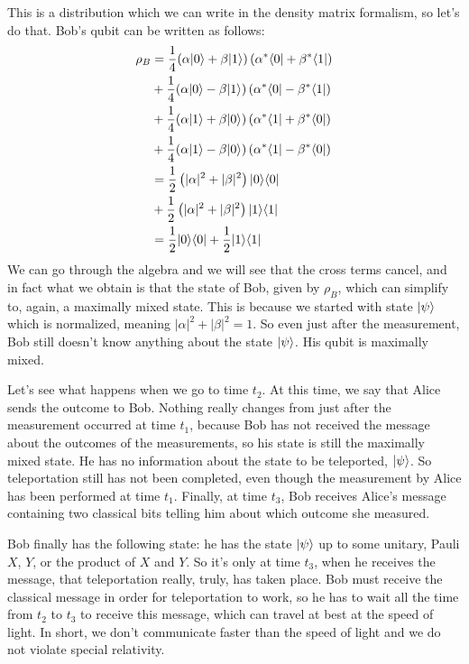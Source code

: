 This is a distribution which we can write in the density matrix formalism, so let's do that. Bob's qubit can be written as follows:
\begin{equation}
\begin{aligned}
\rho_B &=\frac{1}{4}(\alpha|0\rangle+\beta|1\rangle)\left(\alpha^*\langle 0|+\beta^*\langle 1|\right) \\
&+\frac{1}{4}(\alpha|0\rangle-\beta|1\rangle)\left(\alpha^*\langle 0|-\beta^*\langle 1|\right) \\
&+\frac{1}{4}(\alpha|1\rangle+\beta|0\rangle)\left(\alpha^*\langle 1|+\beta^*\langle 0|\right) \\
&+\frac{1}{4}(\alpha|1\rangle-\beta|0\rangle)\left(\alpha^*\langle 1|-\beta^*\langle 0|\right) \\
&=\frac{1}{2}\left(|\alpha|^2+|\beta|^2\right)|0 \rangle \langle 0| \\
&+\frac{1}{2}\left(|\alpha|^2+|\beta|^2\right)|1 \rangle \langle 1| \\
&=\frac{1}{2}|0 \rangle \langle 0|+\frac{1}{2}|1 \rangle \langle 1|
\end{aligned}
\end{equation}
We can go through the algebra and we will see that the cross terms cancel, and in fact what we obtain is that the state of Bob, given by $\rho_B$, which can simplify to, again, a maximally mixed state. This is because we started with state $\left| \psi \right\rangle$ which is normalized, meaning $|\alpha|^2+|\beta|^2 = 1$. So even just after the measurement, Bob still doesn't know anything about the state $\left| \psi \right\rangle$. His qubit is maximally mixed.

Let's see what happens when we go to time $t_2$. At this time, we say that Alice sends the outcome to Bob. Nothing really changes from just after the measurement occurred at time $t_1$, because Bob has not received the message about the outcomes of the measurements, so his state is still the maximally mixed state. He has no information about the state to be teleported, $\left| \psi \right\rangle$. So teleportation still has not been completed, even though the measurement by Alice has been performed at time $t_1$. Finally, at time $t_3$, Bob receives Alice's message containing two classical bits telling him about which outcome she measured.

Bob finally has the following state: he has the state $\left| \psi \right\rangle$ up to some unitary, Pauli $X$, $Y$, or the product of $X$ and $Y$. So it's only at time $t_3$, when he receives the message, that teleportation really, truly, has taken place. Bob must receive the classical message in order for teleportation to work, so he has to wait all the time from $t_2$ to $t_3$ to receive this message, which can travel at best at the speed of light. In short, we don't communicate faster than the speed of light and we do not violate special relativity.


